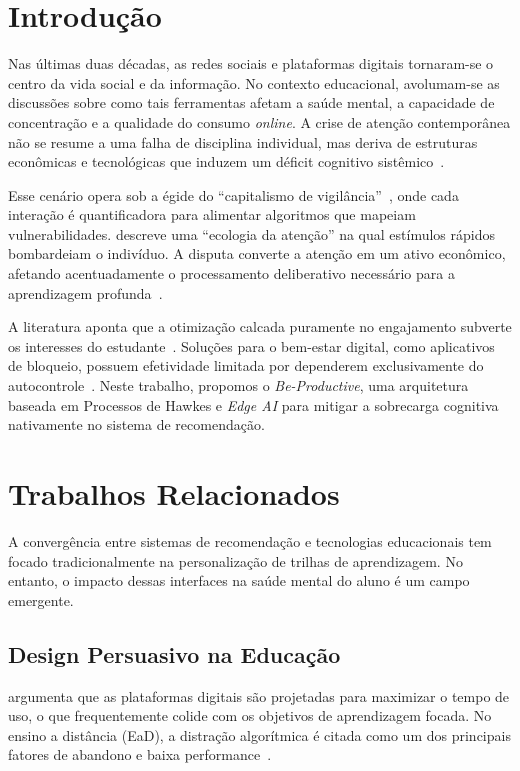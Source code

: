 \documentclass[english, spanish, brazilian]{RBIEarticle}
\begin{document}
\pagebreak

\section{Introdução} \label{sec:intro}

Nas últimas duas décadas, as redes sociais e plataformas digitais tornaram-se o centro da vida social e da informação. No contexto educacional, avolumam-se as discussões sobre como tais ferramentas afetam a saúde mental, a capacidade de concentração e a qualidade do consumo \textit{online}. A crise de atenção contemporânea não se resume a uma falha de disciplina individual, mas deriva de estruturas econômicas e tecnológicas que induzem um déficit cognitivo sistêmico~\citep{hari2022}.

Esse cenário opera sob a égide do ``capitalismo de vigilância''~\citep{zuboff2019}, onde cada interação é quantificadora para alimentar algoritmos que mapeiam vulnerabilidades. \textcite{citton2017} descreve uma ``ecologia da atenção'' na qual estímulos rápidos bombardeiam o indivíduo. A disputa converte a atenção em um ativo econômico, afetando acentuadamente o processamento deliberativo necessário para a aprendizagem profunda~\citep{allcott2021}.

A literatura aponta que a otimização calcada puramente no engajamento subverte os interesses do estudante~\citep{harris2019}. Soluções para o bem-estar digital, como aplicativos de bloqueio, possuem efetividade limitada por dependerem exclusivamente do autocontrole~\citep{lyngs2019}. Neste trabalho, propomos o \textit{Be-Productive}, uma arquitetura baseada em Processos de Hawkes e \textit{Edge AI} para mitigar a sobrecarga cognitiva nativamente no sistema de recomendação.

\section{Trabalhos Relacionados}

A convergência entre sistemas de recomendação e tecnologias educacionais tem focado tradicionalmente na personalização de trilhas de aprendizagem. No entanto, o impacto dessas interfaces na saúde mental do aluno é um campo emergente.

\subsection{Design Persuasivo na Educação}
\textcite{harris2019} argumenta que as plataformas digitais são projetadas para maximizar o tempo de uso, o que frequentemente colide com os objetivos de aprendizagem focada. No ensino a distância (EaD), a distração algorítmica é citada como um dos principais fatores de abandono e baixa performance~\citep{allcott2021}.
\end{document}
